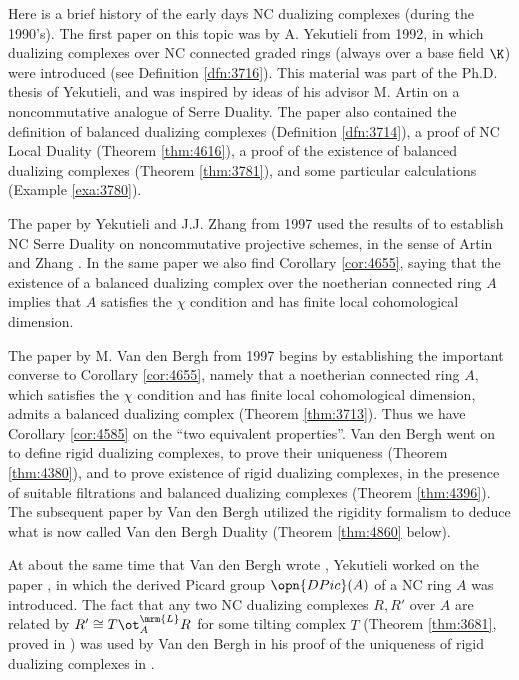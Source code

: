 \begin{rem} \label{rem:4870}
Here is a brief history of the early days NC dualizing complexes (during the 
1990's). The first paper on this topic was \cite{Ye1} by A. Yekutieli from 
1992, in which dualizing complexes over NC connected graded rings (always over a 
base field $\K$) were introduced (see Definition \ref{dfn:3716}).
This material was part of the Ph.D. thesis of Yekutieli, and was inspired by 
ideas of his advisor M. Artin on a noncommutative analogue of Serre Duality. 
The paper \cite{Ye1} also contained the definition of balanced dualizing 
complexes (Definition \ref{dfn:3714}), a proof of NC Local Duality (Theorem 
\ref{thm:4616}), a proof of the existence of balanced dualizing complexes 
(Theorem \ref{thm:3781}), and some particular calculations (Example 
\ref{exa:3780}). 

The paper \cite{YeZh0} by Yekutieli and J.J. Zhang from 1997 used the results 
of \cite{Ye1} to establish NC Serre Duality on noncommutative projective 
schemes, in the sense of Artin and Zhang \cite{ArZh}. In the same paper we 
also find Corollary \ref{cor:4655}, saying that the existence of a balanced 
dualizing complex over the noetherian connected ring $A$ implies that $A$ 
satisfies the $\chi$ condition and has finite local cohomological dimension. 

The paper \cite{VdB} by M. Van den Bergh from 1997 begins by 
establishing the important converse to Corollary \ref{cor:4655}, namely that 
a noetherian connected ring $A$, which satisfies the $\chi$ condition and has 
finite local cohomological dimension, admits a balanced dualizing complex 
(Theorem \ref{thm:3713}). Thus we have Corollary \ref{cor:4585} on the 
``two equivalent properties''. Van den Bergh went on to define rigid dualizing 
complexes, to prove their uniqueness (Theorem \ref{thm:4380}), and to 
prove existence of rigid dualizing complexes, in the presence of suitable 
filtrations and balanced dualizing complexes (Theorem \ref{thm:4396}).
The subsequent paper \cite{VdB2} by Van den Bergh utilized the rigidity 
formalism to deduce what is now called Van den Bergh Duality 
(Theorem \ref{thm:4860} below). 

At about the same time that Van den Bergh wrote \cite{VdB}, Yekutieli worked on 
the paper \cite{Ye4}, in which the derived Picard group $\opn{DPic}(A)$ of a NC 
ring $A$ was introduced. The fact that any two NC dualizing complexes $R, R'$ 
over $A$ are related by $R' \cong T \ot^{\mrm{L}}_{A} R$ for some tilting 
complex $T$ (Theorem \ref{thm:3681}, proved in \cite{Ye4}) 
was used by Van den Bergh in his proof of the uniqueness of rigid dualizing 
complexes in \cite{VdB}.


\end{rem}
